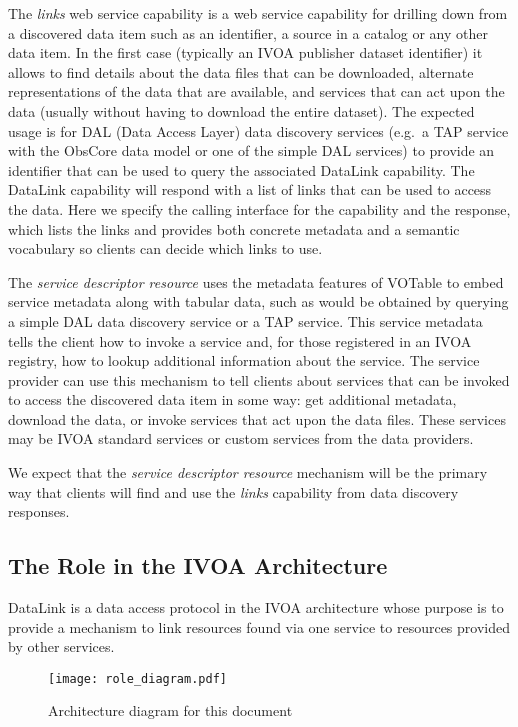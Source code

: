 \documentclass[11pt,a4paper]{ivoa}
\begin{document}
The {\em links\/} web service capability is a web service capability
for drilling
down from a discovered data item such as an identifier,
a source in a catalog or any other data item. In the first case
(typically an IVOA publisher dataset identifier) it allows
to find details about the data files that can be
downloaded, alternate representations of the data that are available, and
services that can act upon the data (usually without having to download
the entire dataset). The expected usage is for DAL (Data Access Layer)
data discovery services (e.g.\ a TAP service \citep{2010ivoa.spec.0327D}
with the ObsCore \citep{2017ivoa.spec.0509L} data
model or one of the simple DAL services) to provide an identifier that
can be used to query the associated DataLink capability. The DataLink
capability will respond with a list of links that can be used to access
the data. Here we specify the calling interface for the capability and
the response, which lists the links and provides both concrete metadata
and a semantic vocabulary so clients can decide which links to use.

The {\em service descriptor resource\/}
uses the metadata features of VOTable to
embed service metadata along with tabular data, such as would be obtained
by querying a simple DAL data discovery service or a TAP service. This
service metadata tells the client how to invoke a service and, for those
registered in an IVOA registry, how to lookup additional information
about the service. The service provider can use this mechanism to tell
clients about services that can be invoked to access the discovered
data item in some way: get additional metadata, download the data, or
invoke services that act upon the data files. These services may be
IVOA standard services or custom services from the data providers.

We expect that the {\em service descriptor resource\/}
mechanism will be the primary way that clients will find and
use the {\em links\/} capability from data discovery
responses.


\subsection{The Role in the IVOA Architecture}

DataLink is a data access protocol in the IVOA architecture whose purpose
is to provide a mechanism to link resources found via one service to
resources provided by other services.

\begin{figure}[ht]
\centering
\texttt{[image: role\_diagram.pdf]}
\caption{Architecture diagram for this document}
\label{fig:archdiag}
\end{figure}
\end{document}
